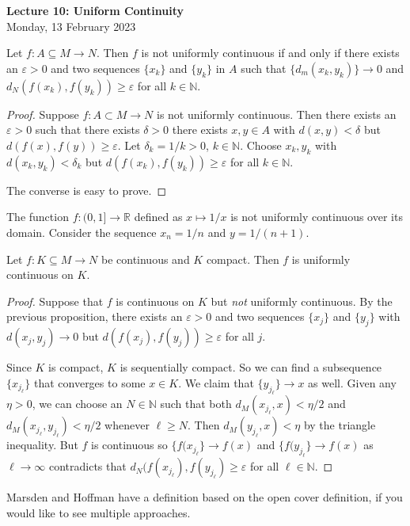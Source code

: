 \documentclass[11pt]{article}
\theoremstyle{definition}
\newcommand{\R}{\mathbb{R}}                      %
\newcommand{\N}{\mathbb{N}}
\begin{document}
\thispagestyle{empty}

\begin{center}
{\LARGE \bf Lecture 10: Uniform Continuity}\\
{\large Monday, 13 February 2023}\\

\end{center}

\prop Let $f:A\subseteq M\to N$. Then $f$ is not uniformly continuous if and only if there exists an $\varepsilon>0$ and two sequences $\{x_k\}$ and $\{y_k\}$ in $A$ such that $\{d_m(x_k,y_k)\}\to 0$ and $d_N(f(x_k),f(y_k))\geq \varepsilon$ for all $k\in \N$.

\begin{proof}
    Suppose $f:A\subset M\to N$ is not uniformly continuous. Then there exists an $\varepsilon>0$ such that there exists $\delta>0$ there exists $x,y\in A$ with $d(x,y)<\delta$ but $d(f(x),f(y))\geq \varepsilon$. Let $\delta_k=1/k>0$, $k\in \N$. Choose $x_k,y_k$ with $d(x_k,y_k)<\delta_k$ but $d(f(x_k),f(y_k))\geq \varepsilon$ for all $k\in \N$.

    The converse is easy to prove.
\end{proof}

\ex The function $f:(0,1]\to \R$ defined as $x\mapsto 1/x$ is not uniformly continuous over its domain. Consider the sequence $x_n=1/n$ and $y=1/(n+1)$.

\prop Let $f:K\subseteq M\to N$ be continuous and $K$ compact. Then $f$ is uniformly continuous on $K$.
\begin{proof}
    Suppose that $f$ is continuous on $K$ but \textit{not} uniformly continuous. By the previous proposition, there exists an $\varepsilon>0$ and two sequences $\{x_j\}$ and $\{y_j\}$ with $d(x_j,y_j)\to 0$ but $d(f(x_j),f(y_j))\geq \varepsilon$ for all $j$.

    Since $K$ is compact, $K$ is sequentially compact. So we can find a subsequence $\{x_{j_\ell}\}$ that converges to some $x\in K$. We claim that $\{y_{j_\ell}\}\to x$ as well. Given any $\eta >0$, we can choose an $N\in \N$ such that both $d_M(x_{j_\ell},x)<\eta/2$ and $d_M(x_{j_\ell},y_{j_\ell})<\eta/2$ whenever $\ell \geq N$. Then $d_M(y_{j_\ell},x)<\eta$ by the triangle inequality. But $f$ is continuous so $\{f(x_{j_\ell}\}\to f(x)$ and $\{f(y_{j_\ell}\}\to f(x)$ as $\ell\to\infty$ contradicts that $d_N(f(x_{j_\ell}),f(y_{j_\ell})\geq \varepsilon$ for all $\ell \in \N$.
\end{proof}
\note Marsden and Hoffman have a definition based on the open cover definition, if you would like to see multiple approaches.
\end{document}

